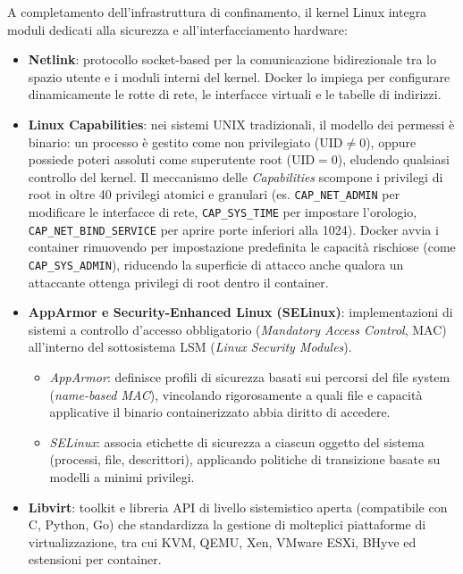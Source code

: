 \documentclass[11pt, a4paper]{article}
\begin{document}
A completamento dell'infrastruttura di confinamento, il kernel Linux integra moduli dedicati alla sicurezza e all'interfacciamento hardware:
\begin{itemize}
    \item \textbf{Netlink}: protocollo socket-based per la comunicazione bidirezionale tra lo spazio utente e i moduli interni del kernel. Docker lo impiega per configurare dinamicamente le rotte di rete, le interfacce virtuali e le tabelle di indirizzi.
    \item \textbf{Linux Capabilities}: nei sistemi UNIX tradizionali, il modello dei permessi è binario: un processo è gestito come non privilegiato ($\text{UID} \neq 0$), oppure possiede poteri assoluti come superutente root ($\text{UID} = 0$), eludendo qualsiasi controllo del kernel. Il meccanismo delle \emph{Capabilities} scompone i privilegi di root in oltre 40 privilegi atomici e granulari (es. \texttt{CAP\_NET\_ADMIN} per modificare le interfacce di rete, \texttt{CAP\_SYS\_TIME} per impostare l'orologio, \texttt{CAP\_NET\_BIND\_SERVICE} per aprire porte inferiori alla 1024). Docker avvia i container rimuovendo per impostazione predefinita le capacità rischiose (come \texttt{CAP\_SYS\_ADMIN}), riducendo la superficie di attacco anche qualora un attaccante ottenga privilegi di root dentro il container.
    \item \textbf{AppArmor e Security-Enhanced Linux (SELinux)}: implementazioni di sistemi a controllo d'accesso obbligatorio (\emph{Mandatory Access Control}, MAC) all'interno del sottosistema LSM (\emph{Linux Security Modules}).
    \begin{itemize}
        \item \emph{AppArmor}: definisce profili di sicurezza basati sui percorsi del file system (\emph{name-based MAC}), vincolando rigorosamente a quali file e capacità applicative il binario containerizzato abbia diritto di accedere.
        \item \emph{SELinux}: associa etichette di sicurezza a ciascun oggetto del sistema (processi, file, descrittori), applicando politiche di transizione basate su modelli a minimi privilegi.
    \end{itemize}
    \item \textbf{Libvirt}: toolkit e libreria API di livello sistemistico aperta (compatibile con C, Python, Go) che standardizza la gestione di molteplici piattaforme di virtualizzazione, tra cui KVM, QEMU, Xen, VMware ESXi, BHyve ed estensioni per container.
\end{itemize}
\end{document}
